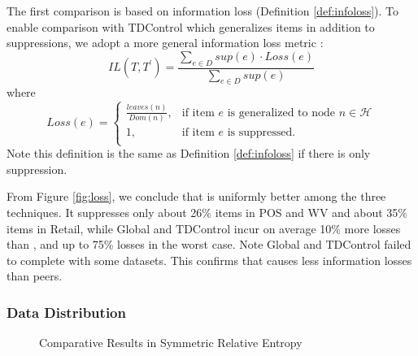 The first comparison is based on information loss (Definition
 \ref{def:infoloss}).
To enable comparison with TDControl which generalizes items in addition to
suppressions, we adopt a more general information loss metric \cite{Cao:2010:rho}:
\[ IL(T,T^\prime)=\frac{\sum_{e\in D}sup(e)\cdot Loss(e)}{\sum_{e\in D}sup(e)}\]
where
\[ Loss(e)=\begin{cases}
  \frac{leaves(n)}{Dom(n)}, & \text{if item $e$ is generalized to node $n\in\mathcal{H}$}\\
  1,                          & \text{if item $e$ is suppressed.} \\
\end{cases} \]
Note this definition is the same as Definition \ref{def:infoloss}
if there is only suppression.

From Figure \ref{fig:loss},
we conclude that \PartialR is uniformly better among the three techniques.
It suppresses only about 26\% items in POS and WV and about 35\% items in
Retail, while Global and TDControl
incur on average 10\% more losses than \PartialR, and up to 75\% losses
in the worst case.
Note Global and TDControl failed to complete with some datasets.
This confirms that \PartialR causes less information losses than peers.


\subsubsection{Data Distribution}\label{sec:eval:datadistribution}

\begin{figure}[th]
\flushleft
{}
\caption{Comparative Results in Symmetric Relative Entropy}
\label{fig:entropy}
\end{figure}

